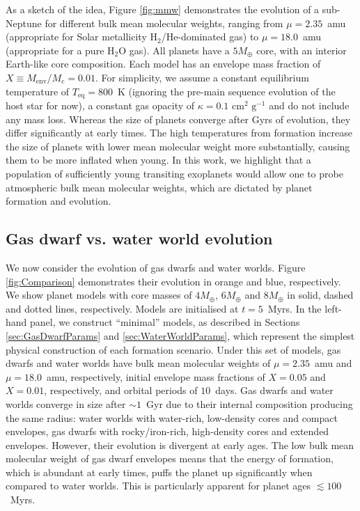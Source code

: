 \documentclass[fleqn,usenatbib]{mnras}
\begin{document}
As a sketch of the idea, Figure \ref{fig:mmw} demonstrates the evolution of a sub-Neptune for different bulk mean molecular weights, ranging from $\mu=2.35$~amu (appropriate for Solar metallicity H$_2$/He-dominated gas) to $\mu=18.0$~amu (appropriate for a pure H$_2$O gas). All planets have a $5M_\oplus$ core, with an interior Earth-like core composition. Each model has an envelope mass fraction of $X \equiv M_\text{env} / M_\text{c} = 0.01$. For simplicity, we assume a constant equilibrium temperature of $T_\text{eq}=800$~K (ignoring the pre-main sequence evolution of the host star for now), a constant gas opacity of $\kappa = 0.1 \text{ cm}^2 \text{ g}^{-1}$ and do not include any mass loss. Whereas the size of planets converge after Gyrs of evolution, they differ significantly at early times. The high temperatures from formation increase the size of planets with lower mean molecular weight more substantially, causing them to be more inflated when young. In this work, we highlight that a population of sufficiently young transiting exoplanets would allow one to probe atmospheric bulk mean molecular weights, which are dictated by planet formation and evolution.

\subsection{Gas dwarf vs. water world evolution}

We now consider the evolution of gas dwarfs and water worlds. Figure \ref{fig:Comparison} demonstrates their evolution in orange and blue, respectively. We show planet models with core masses of $4M_\oplus$, $6M_\oplus$ and $8M_\oplus$ in solid, dashed and dotted lines, respectively. Models are initialised at $t=5$~Myrs. In the left-hand panel, we construct ``minimal'' models, as described in Sections \ref{sec:GasDwarfParams} and \ref{sec:WaterWorldParams}, which represent the simplest physical construction of each formation scenario. Under this set of models, gas dwarfs and water worlds have bulk mean molecular weights of $\mu=2.35$~amu and $\mu=18.0$~amu, respectively, initial envelope mass fractions of $X = 0.05$ and $X = 0.01$, respectively, and orbital periods of $10$~days. Gas dwarfs and water worlds converge in size after $\sim 1$~Gyr due to their internal composition producing the same radius: water worlds with water-rich, low-density cores and compact envelopes, gas dwarfs with rocky/iron-rich, high-density cores and extended envelopes. However, their evolution is divergent at early ages. The low bulk mean molecular weight of gas dwarf envelopes means that the energy of formation, which is abundant at early times, puffs the planet up significantly when compared to water worlds. This is particularly apparent for planet ages $\lesssim 100$~Myrs.
\end{document}
